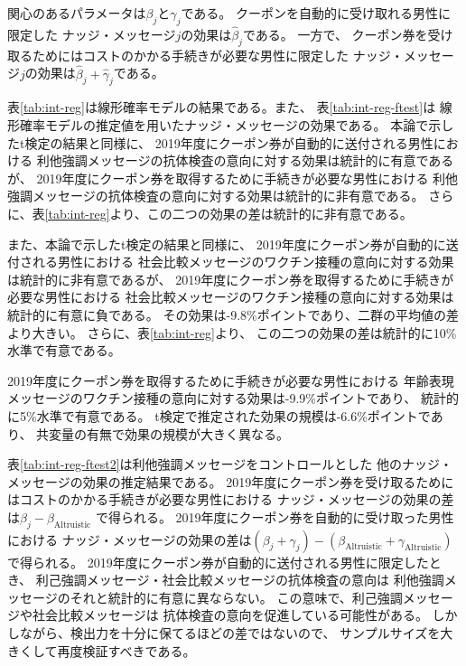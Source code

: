 \documentclass[
  11pt,
  a4paper,
]{article}
\begin{document}
関心のあるパラメータは\(\beta_j\)と\(\gamma_j\)である。
クーポンを自動的に受け取れる男性に限定した
ナッジ・メッセージ\(j\)の効果は\(\hat{\beta}_j\)である。
一方で、
クーポン券を受け取るためにはコストのかかる手続きが必要な男性に限定した
ナッジ・メッセージ\(j\)の効果は\(\hat{\beta}_j + \hat{\gamma}_j\)である。

表\ref{tab:int-reg}は線形確率モデルの結果である。また、
表\ref{tab:int-reg-ftest}は
線形確率モデルの推定値を用いたナッジ・メッセージの効果である。
本論で示したt検定の結果と同様に、
2019年度にクーポン券が自動的に送付される男性における
利他強調メッセージの抗体検査の意向に対する効果は統計的に有意であるが、
2019年度にクーポン券を取得するために手続きが必要な男性における
利他強調メッセージの抗体検査の意向に対する効果は統計的に非有意である。
さらに、表\ref{tab:int-reg}より、この二つの効果の差は統計的に非有意である。

また、本論で示したt検定の結果と同様に、
2019年度にクーポン券が自動的に送付される男性における
社会比較メッセージのワクチン接種の意向に対する効果は統計的に非有意であるが、
2019年度にクーポン券を取得するために手続きが必要な男性における
社会比較メッセージのワクチン接種の意向に対する効果は統計的に有意に負である。
その効果は-9.8\%ポイントであり、二群の平均値の差より大きい。
さらに、表\ref{tab:int-reg}より、
この二つの効果の差は統計的に10\%水準で有意である。

2019年度にクーポン券を取得するために手続きが必要な男性における
年齢表現メッセージのワクチン接種の意向に対する効果は-9.9\%ポイントであり、
統計的に5\%水準で有意である。
t検定で推定された効果の規模は-6.6\%ポイントであり、
共変量の有無で効果の規模が大きく異なる。

表\ref{tab:int-reg-ftest2}は利他強調メッセージをコントロールとした
他のナッジ・メッセージの効果の推定結果である。
2019年度にクーポン券を受け取るためにはコストのかかる手続きが必要な男性における
ナッジ・メッセージの効果の差は\(\beta_j - \beta_{\text{Altruistic}}\)
で得られる。
2019年度にクーポン券を自動的に受け取った男性における
ナッジ・メッセージの効果の差は\((\beta_j + \gamma_j) - (\beta_{\text{Altruistic}} + \gamma_{\text{Altruistic}})\)
で得られる。
2019年度にクーポン券が自動的に送付される男性に限定したとき、
利己強調メッセージ・社会比較メッセージの抗体検査の意向は
利他強調メッセージのそれと統計的に有意に異ならない。
この意味で、利己強調メッセージや社会比較メッセージは
抗体検査の意向を促進している可能性がある。
しかしながら、検出力を十分に保てるほどの差ではないので、
サンプルサイズを大きくして再度検証すべきである。
\end{document}
